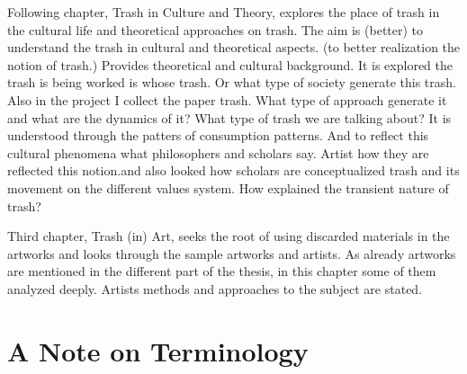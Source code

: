 Following chapter, Trash in Culture and Theory, explores the place of trash in the cultural life and theoretical approaches on trash. The aim is (better) to understand the trash in cultural and theoretical aspects. (to better realization the notion of trash.) Provides theoretical and cultural background. It is explored the trash is being worked is whose trash. Or what type of society generate this trash. Also in the project I collect the paper trash. What type of approach generate it and what are the dynamics of it? What type of trash we are talking about? It is understood through the patters of consumption patterns. And to reflect this cultural phenomena what philosophers and scholars say. Artist how they are reflected this notion.and also looked how scholars are conceptualized trash and its movement on the different values system. How explained the transient nature of trash?

Third chapter, Trash (in) Art, seeks the root of using discarded materials in the artworks and looks through the sample artworks and artists. As already artworks are mentioned in the different part of the thesis, in this chapter some of them analyzed deeply. Artists methods and approaches to the subject are stated.



\section{A Note on Terminology}

